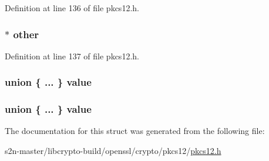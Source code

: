 Definition at line 136 of file pkcs12.\+h.

\subsubsection[{\texorpdfstring{other}{other}}]{$\ast$ other}\hypertarget{structpkcs12__bag__st_a913b5f8be6ebbc8d847d25c9279ee3d2}{}\label{structpkcs12__bag__st_a913b5f8be6ebbc8d847d25c9279ee3d2}


Definition at line 137 of file pkcs12.\+h.

\subsubsection[{\texorpdfstring{value}{value}}]{\setlength{\rightskip}{0pt plus 5cm}union \{ ... \}   value}\hypertarget{structpkcs12__bag__st_aef0c6342dfb6b48dd566e9c7b0149539}{}\label{structpkcs12__bag__st_aef0c6342dfb6b48dd566e9c7b0149539}
\subsubsection[{\texorpdfstring{value}{value}}]{\setlength{\rightskip}{0pt plus 5cm}union \{ ... \}   value}\hypertarget{structpkcs12__bag__st_aff15caec5e8dcb53235e51f3e74ee103}{}\label{structpkcs12__bag__st_aff15caec5e8dcb53235e51f3e74ee103}


The documentation for this struct was generated from the following file\+:\begin{DoxyCompactItemize}
\item 
s2n-\/master/libcrypto-\/build/openssl/crypto/pkcs12/\hyperlink{crypto_2pkcs12_2pkcs12_8h}{pkcs12.\+h}\end{DoxyCompactItemize}
